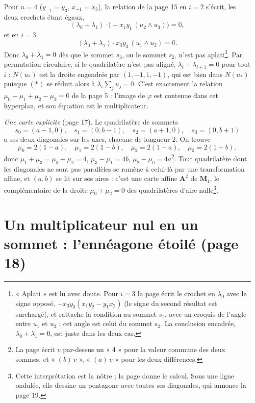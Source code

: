 \documentclass[11pt,a4paper]{article}
\begin{document}
Pour $n = 4$ ($y_{-1} = y_3$, $x_{-1} = x_3$), la relation de la page 15 en
$i = 2$ s'écrit, les deux crochets étant égaux,
\[
  (\lambda_0 + \lambda_1) \cdot \bigl( -x_1 y_1\, (u_2 \wedge u_3) \bigr) = 0 ,
\]
et en $i = 3$
\[
  (\lambda_0 + \lambda_1) \cdot x_3 y_3\, (u_1 \wedge u_2) = 0 .
\]
Donc $\lambda_0 + \lambda_1 = 0$ dès que le sommet $s_3$, ou le sommet $s_2$,
n'est pas aplati\footnote{« Aplati » est lu avec doute. Pour $i = 3$ la page
écrit le crochet en $\lambda_0$ avec le signe opposé, $-x_3 y_3 (x_1 y_2 - y_1
x_2)$ (le signe du second résultat est surchargé), et rattache la condition au
sommet $s_1$, avec un croquis de l'angle entre $u_1$ et $u_2$ ; cet angle est
celui du sommet $s_2$. La conclusion encadrée, $\lambda_0 + \lambda_1 = 0$, est
juste dans les deux cas.}. Par permutation circulaire, si le quadrilatère n'est
pas aligné, $\lambda_i + \lambda_{i+1} = 0$ pour tout $i$ : $N(u_*)$ est la
droite engendrée par $(1, -1, 1, -1)$, qui est bien dans $N(u_*)$ puisque
$(\ast)$ se réduit alors à $\lambda_i \sum_j u_j = 0$. C'est exactement la
relation $\mu_0 - \mu_1 + \mu_2 - \mu_3 = 0$ de la page 5 : l'image de
$\varphi$ est contenue dans cet hyperplan, et son équation est le
multiplicateur.

\emph{Une carte explicite} (page 17). Le quadrilatère de sommets
\[
  s_0 = (a - 1, 0), \quad s_1 = (0, b - 1), \quad
  s_2 = (a + 1, 0), \quad s_3 = (0, b + 1)
\]
a ses deux diagonales sur les axes, chacune de longueur 2. On trouve
\[
  \mu_0 = 2(1 - a), \quad \mu_1 = 2(1 - b), \quad
  \mu_2 = 2(1 + a), \quad \mu_3 = 2(1 + b),
\]
donc $\mu_1 + \mu_3 = \mu_0 + \mu_2 = 4$, $\mu_3 - \mu_1 = 4b$,
$\mu_2 - \mu_0 = 4a$\footnote{La page écrit $v$ par-dessus un « 4 » pour la
valeur commune des deux sommes, et « $(b)\,v$ », « $(a)\,v$ » pour les deux
différences.}. Tout quadrilatère dont les diagonales ne sont pas parallèles se
ramène à celui-là par une transformation affine, et $(a, b)$ se lit sur ses
aires : c'est une carte affine $\mathbf{A}^2$ de $\mathbf{M}_4$, le
complémentaire de la droite $\mu_0 + \mu_2 = 0$ des quadrilatères d'aire
nulle\footnote{Cette interprétation est la nôtre ; la page donne le calcul. Sous
une ligne ondulée, elle dessine un pentagone avec toutes ses diagonales, qui
annonce la page 19.}.

\section*{Un multiplicateur nul en un sommet : l'ennéagone étoilé (page 18)}
\end{document}
